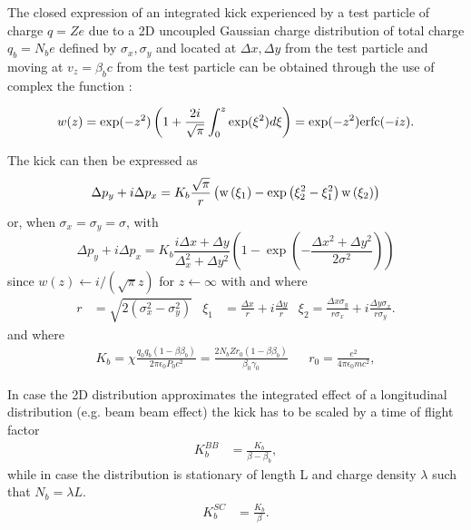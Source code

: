 \documentclass[english]{article}
\begin{document}
The closed expression of an integrated kick experienced by a test particle of charge  $q=Z e$ due to a 2D uncoupled Gaussian charge distribution of total charge $q_b=N_b e$ defined by $\sigma_x, \sigma_y$ and located at $\Delta x, \Delta y$ from the test particle and moving at $v_z=\beta_b c$ from the test particle can be obtained through the use of complex the function \cite{bassetti-erskine}:

\begin{align}
w(z)=\exp({-z^2})\left(1+\frac{2i}{\sqrt{\pi}}\int_0^z \exp({\xi^2}) d\xi \right)=
     \exp({-z^2}){\rm erfc}(-iz).
\end{align}

The kick can then be expressed as
\begin{equation}
\Delta p_y+i \Delta p_x= K_b \frac{\sqrt{\pi}}{r}
\left( {\rm w}\left(\xi_1 \right)
       -\exp\left( \xi_2^2-\xi_1^2 \right)
         {\rm w}\left( \xi_2 \right)
\right)
\end{equation}
or, when $\sigma_x=\sigma_y=\sigma$, with
\begin{equation}
\Delta p_y+i \Delta p_x= K_b \frac{i \Delta x+ \Delta y}{\Delta_x^2+\Delta y^2}
\left( 1 - \exp\left(-\frac{\Delta x^2+\Delta y^2}{2\sigma^2}\right) \right)
\end{equation}
since $w(z) \leftarrow i / (\sqrt{\pi} z) $ for $z\leftarrow \infty$ with and where
\begin{align}
r&=\sqrt{2(\sigma_x^2 - \sigma_y^2)} &
\xi_1&=\frac {\Delta x}r +i \frac {\Delta y}r &
\xi_2= \frac{\Delta x\sigma_y}{r\sigma_x}+i \frac{\Delta y \sigma_x}{r\sigma_y}.
\end{align}
and where
\begin{align}
K_b 
=\chi \frac{q_0 q_b  (1 -\beta \beta_b)}{2\pi \epsilon_0  P_0 c^2}
=\frac{2 N_b Z r_0 (1 -\beta \beta_b)}{ \beta_0 \gamma_0} && 
r_0=\frac{e^2}{4\pi\epsilon_0 m c^2},
\end{align}

In case the 2D distribution approximates the integrated effect of a longitudinal distribution (e.g. beam beam effect) the kick has to be scaled by a time of flight factor
\begin{align}
K_b^{BB}&=\frac{K_b}{\beta - \beta_b}, 
\end{align}
while in case the distribution is stationary of length L and charge density $\lambda$ such that $N_b=\lambda L$.
\begin{align}
K_b^{SC}&=\frac{K_b}{\beta}. 
\end{align}
\end{document}

